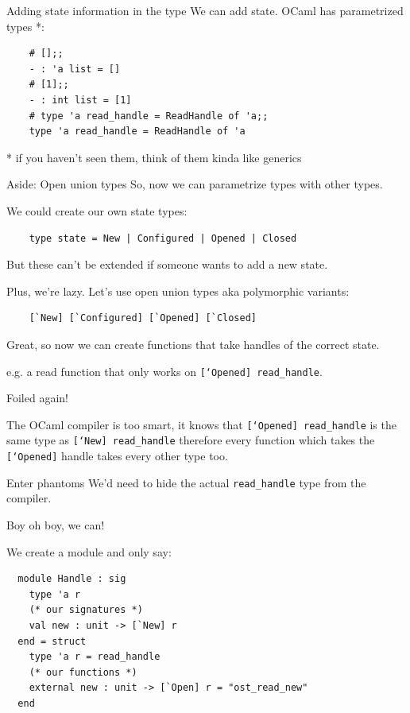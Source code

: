 \documentclass{beamer}
\renewcommand{\example}[1]{{\usebeamercolor[fg]{example text} #1}}
\begin{document}
\begin{frame}[fragile]{Adding state information in the type}
  We can add state. OCaml has parametrized types *:

  \begin{verbatim}
    # [];;
    - : 'a list = []
    # [1];;
    - : int list = [1]
    # type 'a read_handle = ReadHandle of 'a;;
    type 'a read_handle = ReadHandle of 'a
  \end{verbatim}

  * if you haven't seen them, think of them kinda like generics
\end{frame}

\begin{frame}[fragile]{Aside: Open union types}
  So, now we can \example{parametrize types with other types}.

  We could create our own state types:
  \begin{verbatim}
    type state = New | Configured | Opened | Closed
  \end{verbatim}
  \pause
  But these \alert{can't be extended} if someone wants to add a new state.
  \pause

  Plus, we're lazy. Let's use \example{open union types} aka polymorphic variants:
  \begin{verbatim}
    [`New] [`Configured] [`Opened] [`Closed]
  \end{verbatim}
\end{frame}

\begin{frame}
  Great, so now we can create functions that take handles of the correct state.

  e.g. a read function that only works on \texttt{[`Opened] read\_handle}.

  \pause
  \alert{Foiled again!}
  \pause

  The OCaml compiler is too smart, it knows that \texttt{[`Opened] read\_handle} is the
  same type as \texttt{[`New] read\_handle} therefore every function which takes
  the \texttt{[`Opened]} handle takes every other type too.
\end{frame}

\begin{frame}[fragile]{Enter phantoms}
  We'd need to \alert{hide} the actual \texttt{read\_handle} type from the compiler.

  \pause

  Boy oh boy, we can!

  \pause

  We create a module and only say:
  \begin{verbatim}
  module Handle : sig
    type 'a r
    (* our signatures *)
    val new : unit -> [`New] r
  end = struct
    type 'a r = read_handle
    (* our functions *)
    external new : unit -> [`Open] r = "ost_read_new"
  end
  \end{verbatim}
\end{frame}
\end{document}
